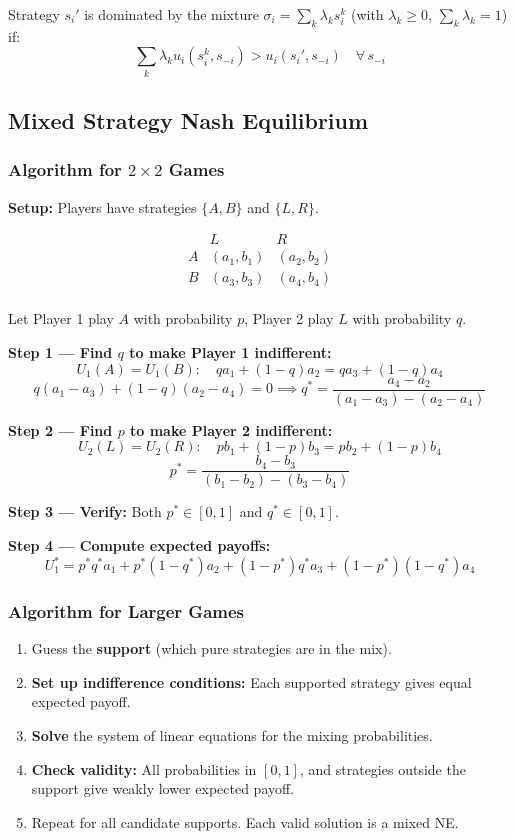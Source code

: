 \documentclass[hidelinks]{article}
\begin{document}
Strategy $s_i'$ is dominated by the mixture $\sigma_i = \sum_k \lambda_k s_i^k$ (with $\lambda_k \geq 0$, $\sum_k \lambda_k = 1$) if:
\[
\sum_k \lambda_k u_i(s_i^k, s_{-i}) > u_i(s_i', s_{-i}) \quad \forall\, s_{-i}
\]

\subsection{Mixed Strategy Nash Equilibrium}

\subsubsection{Algorithm for $2 \times 2$ Games}

\textbf{Setup:} Players have strategies $\{A, B\}$ and $\{L, R\}$.

\[
\begin{array}{c|cc}
 & L & R \\
\hline
A & (a_1, b_1) & (a_2, b_2) \\
B & (a_3, b_3) & (a_4, b_4) \\
\end{array}
\]

Let Player 1 play $A$ with probability $p$, Player 2 play $L$ with probability $q$.

\textbf{Step 1 — Find $q$ to make Player 1 indifferent:}
\[
U_1(A) = U_1(B): \quad q a_1 + (1-q) a_2 = q a_3 + (1-q) a_4
\]
\[
q(a_1 - a_3) + (1-q)(a_2 - a_4) = 0 \implies q^* = \frac{a_4 - a_2}{(a_1 - a_3) - (a_2 - a_4)}
\]

\textbf{Step 2 — Find $p$ to make Player 2 indifferent:}
\[
U_2(L) = U_2(R): \quad p b_1 + (1-p) b_3 = p b_2 + (1-p) b_4
\]
\[
p^* = \frac{b_4 - b_3}{(b_1 - b_2) - (b_3 - b_4)}
\]

\textbf{Step 3 — Verify:} Both $p^* \in [0,1]$ and $q^* \in [0,1]$.

\textbf{Step 4 — Compute expected payoffs:}
\[
U_1^* = p^* q^* a_1 + p^*(1-q^*) a_2 + (1-p^*)q^* a_3 + (1-p^*)(1-q^*)a_4
\]

\subsubsection{Algorithm for Larger Games}

\begin{enumerate}
    \item Guess the \textbf{support} (which pure strategies are in the mix).
    \item \textbf{Set up indifference conditions:} Each supported strategy gives equal expected payoff.
    \item \textbf{Solve} the system of linear equations for the mixing probabilities.
    \item \textbf{Check validity:} All probabilities in $[0,1]$, and strategies outside the support give weakly lower expected payoff.
    \item Repeat for all candidate supports. Each valid solution is a mixed NE.
\end{enumerate}
\end{document}
